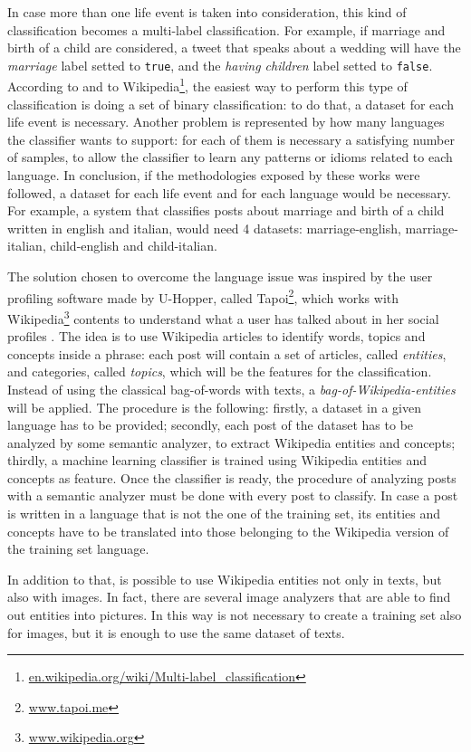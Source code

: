 In case more than one life event is taken into consideration, this kind of classification becomes a multi-label classification. For example, if marriage and birth of a child are considered, a tweet that speaks about a wedding will have the \emph{marriage} label setted to \texttt{true}, and the \emph{having children} label setted to \texttt{false}. According to \cite{cavalinclassification} and to Wikipedia\footnote{\url{en.wikipedia.org/wiki/Multi-label_classification}}, the easiest way to perform this type of classification is doing a set of binary classification: to do that, a dataset for each life event is necessary. Another problem is represented by how many languages the classifier wants to support: for each of them is necessary a satisfying number of samples, to allow the classifier to learn any patterns or idioms related to each language. In conclusion, if the methodologies exposed by these works were followed, a dataset for each life event and for each language would be necessary. For example, a system that classifies posts about marriage and birth of a child written in english and italian, would need 4 datasets: marriage-english, marriage-italian, child-english and child-italian.

The solution chosen to overcome the language issue was inspired by the user profiling software made by U-Hopper, called Tapoi\footnote{\url{www.tapoi.me}}, which works with Wikipedia\footnote{\url{www.wikipedia.org}} contents to understand what a user has talked about in her social profiles \cite{torrero2018wikipedia}. The idea is to use Wikipedia articles to identify words, topics and concepts inside a phrase: each post will contain a set of articles, called \emph{entities}, and categories, called \emph{topics}, which will be the features for the classification. Instead of using the classical bag-of-words with texts, a \emph{bag-of-Wikipedia-entities} will be applied. The procedure is the following: firstly, a dataset in a given language has to be provided; secondly, each post of the dataset has to be analyzed by some semantic analyzer, to extract Wikipedia entities and concepts; thirdly, a machine learning classifier is trained using Wikipedia entities and concepts as feature. Once the classifier is ready, the procedure of analyzing posts with a semantic analyzer must be done with every post to classify. In case a post is written in a language that is not the one of the training set, its entities and concepts have to be translated into those belonging to the Wikipedia version of the training set language.

In addition to that, is possible to use Wikipedia entities not only in texts, but also with images. In fact, there are several image analyzers that are able to find out entities into pictures. In this way is not necessary to create a training set also for images, but it is enough to use the same dataset of texts.

